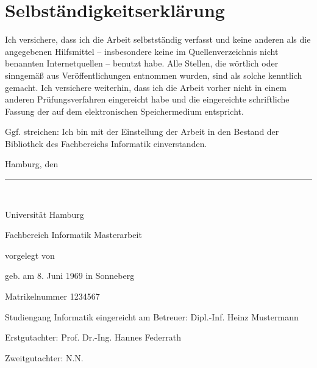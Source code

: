 \documentclass[
    12pt,
    headings=small,
    parskip=half,           %
    bibliography=totoc,
    numbers=noenddot,       %
    open=any,               %
    ]{scrreprt}
\begin{document}
\chapter*{Selbständigkeitserklärung}
\vspace{1cm}

Ich versichere, dass ich die Arbeit selbstständig verfasst und keine anderen als die angegebenen Hilfsmittel -- insbesondere keine im Quellenverzeichnis nicht benannten Internetquellen -- benutzt habe. Alle Stellen, die wörtlich oder sinngemäß aus Veröffentlichungen entnommen wurden, sind als solche kenntlich gemacht. Ich versichere weiterhin, dass ich die Arbeit vorher nicht in einem anderen Prüfungsverfahren eingereicht habe und die eingereichte schriftliche Fassung der auf dem elektronischen Speichermedium entspricht.

Ggf. streichen: Ich bin mit der Einstellung der Arbeit in den Bestand der Bibliothek des Fachbereichs Informatik einverstanden.

\makeatletter
Hamburg, den {\@date}
\makeatother

\vspace{2cm}
\rule{6cm}{0.25pt}\\
\makeatletter
{\@author} \par
\makeatother


\newpage
\thispagestyle{empty}
\begin{titlepage}%
\begin{center}\Large
	Universität Hamburg \par
	Fachbereich Informatik
	\vfill
	Masterarbeit
	\vfill
	\makeatletter
	{\Large\textsf{\textbf{\@title}}\par}
	\makeatother
	\vfill
	vorgelegt von
	\par\bigskip
	\makeatletter
	{\@author} \par
	\makeatother
	geb. am 8. Juni 1969 in Sonneberg \par
	Matrikelnummer 1234567 \par
	Studiengang Informatik
	\vfill
	\makeatletter
	eingereicht am {\@date}
	\makeatother
	\vfill
	Betreuer: Dipl.-Inf. Heinz Mustermann \par
	Erstgutachter: Prof. Dr.-Ing. Hannes Federrath \par
	Zweitgutachter: N.N.
\end{center}
\end{titlepage}%
\end{document}
